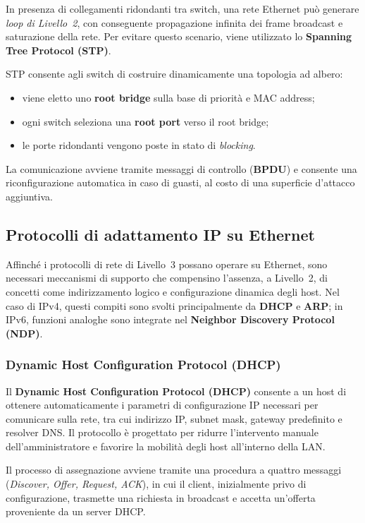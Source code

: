 In presenza di collegamenti ridondanti tra switch, una rete Ethernet può generare \emph{loop di Livello~2},
con conseguente propagazione infinita dei frame broadcast e saturazione della rete.
Per evitare questo scenario, viene utilizzato lo \textbf{Spanning Tree Protocol (STP)}.

STP consente agli switch di costruire dinamicamente una topologia ad albero:
\begin{itemize}
  \item viene eletto uno \textbf{root bridge} sulla base di priorità e MAC address;
  \item ogni switch seleziona una \textbf{root port} verso il root bridge;
  \item le porte ridondanti vengono poste in stato di \emph{blocking}.
\end{itemize}

La comunicazione avviene tramite messaggi di controllo (\textbf{BPDU}) e consente una riconfigurazione automatica
in caso di guasti, al costo di una superficie d’attacco aggiuntiva.

\subsection{Protocolli di adattamento IP su Ethernet}

Affinché i protocolli di rete di Livello~3 possano operare su Ethernet, sono necessari
meccanismi di supporto che compensino l’assenza, a Livello~2, di concetti come indirizzamento
logico e configurazione dinamica degli host.
Nel caso di IPv4, questi compiti sono svolti principalmente da \textbf{DHCP} e \textbf{ARP};
in IPv6, funzioni analoghe sono integrate nel \textbf{Neighbor Discovery Protocol (NDP)}.

\subsubsection{Dynamic Host Configuration Protocol (DHCP)}

Il \textbf{Dynamic Host Configuration Protocol (DHCP)} consente a un host di ottenere automaticamente
i parametri di configurazione IP necessari per comunicare sulla rete, tra cui indirizzo IP,
subnet mask, gateway predefinito e resolver DNS.
Il protocollo è progettato per ridurre l’intervento manuale dell’amministratore e favorire
la mobilità degli host all’interno della LAN.

Il processo di assegnazione avviene tramite una procedura a quattro messaggi
(\emph{Discover, Offer, Request, ACK}), in cui il client, inizialmente privo di configurazione,
trasmette una richiesta in broadcast e accetta un’offerta proveniente da un server DHCP.

